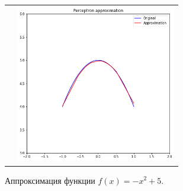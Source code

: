 \documentclass[12pt, a4paper]{article}
\begin{document}
\begin{figure}[h]
\begin{tabular}{cc}
            &
            \includegraphics[width = 7cm]{f11_1_4.png} \\
        \end{tabular}
        \label{image1}
        \caption{Аппроксимация функции $f(x) = - x^2 + 5$.}
    \end{figure}
    
\end{document}
